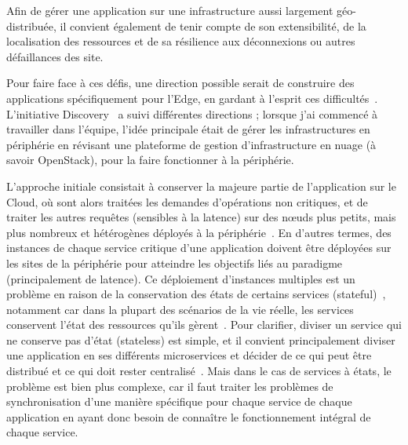 Afin de gérer une application sur une infrastructure aussi largement
géo-distribuée, il convient également de tenir compte de son
extensibilité, de la localisation des ressources et de sa résilience
aux déconnexions ou autres défaillances des site.
%

Pour faire face à ces défis, une direction possible serait de
construire des applications spécifiquement pour l'Edge, en gardant à
l'esprit ces difficultés~\cite{DMVM18, CSFN19}.
%
L'initiative Discovery~\cite{discovery} a suivi différentes directions
; lorsque j'ai commencé à travailler dans l'équipe, l'idée principale
était de gérer les infrastructures en périphérie en révisant une
plateforme de gestion d'infrastructure en nuage (à savoir OpenStack),
pour la faire fonctionner à la périphérie.




L'approche initiale consistait à conserver la majeure partie de
l'application sur le Cloud, où sont alors traitées les demandes
d'opérations non critiques, et de traiter les autres requêtes
(sensibles à la latence) sur des nœuds plus petits, mais plus nombreux
et hétérogènes déployés à la périphérie~\cite{SCZLX16}.
%
En d'autres termes, des instances de chaque service critique d'une
application doivent être déployées sur les sites de la périphérie pour
atteindre les objectifs liés au paradigme (principalement de latence).
%
Ce déploiement d'instances multiples est un problème en raison de la
conservation des états de certains services (stateful)~\cite{Sal78,
  TBRT19}, notamment car dans la plupart des scénarios de la vie
réelle, les services conservent l'état des ressources qu'ils
gèrent~\cite{BKPP+09}.
%
Pour clarifier, diviser un service qui ne conserve pas d'état
(stateless) est simple, et il convient principalement diviser une
application en ses différents microservices et décider de ce qui peut
être distribué et ce qui doit rester centralisé~\cite{TBRT19}.
%
Mais dans le cas de services à états, le problème est bien plus
complexe, car il faut traiter les problèmes de synchronisation d'une
manière spécifique pour chaque service de chaque application en ayant
donc besoin de connaître le fonctionnement intégral de chaque service.


